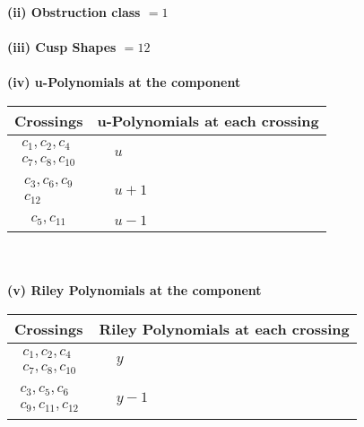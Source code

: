 \documentclass[1p]{elsarticle_modified}
\theoremstyle{definition}
\begin{document}
\flushleft \textbf{(ii) Obstruction class $= 1$}\\~\\
\flushleft \textbf{(iii) Cusp Shapes $= 12$}\\~\\
\newpage\renewcommand{\arraystretch}{1}
\flushleft \textbf{(iv) u-Polynomials at the component}\newline \\
\begin{tabular}{m{50pt}|m{274pt}}
Crossings & \hspace{64pt}u-Polynomials at each crossing \\
\hline $$\begin{aligned}c_{1},c_{2},c_{4}\\c_{7},c_{8},c_{10}\end{aligned}$$&$\begin{aligned}
&u
\end{aligned}$\\
\hline $$\begin{aligned}c_{3},c_{6},c_{9}\\c_{12}\end{aligned}$$&$\begin{aligned}
&u+1
\end{aligned}$\\
\hline $$\begin{aligned}c_{5},c_{11}\end{aligned}$$&$\begin{aligned}
&u-1
\end{aligned}$\\
\hline
\end{tabular}\\~\\
\newpage\renewcommand{\arraystretch}{1}
\flushleft \textbf{(v) Riley Polynomials at the component}\newline \\
\begin{tabular}{m{50pt}|m{274pt}}
Crossings & \hspace{64pt}Riley Polynomials at each crossing \\
\hline $$\begin{aligned}c_{1},c_{2},c_{4}\\c_{7},c_{8},c_{10}\end{aligned}$$&$\begin{aligned}
&y
\end{aligned}$\\
\hline $$\begin{aligned}c_{3},c_{5},c_{6}\\c_{9},c_{11},c_{12}\end{aligned}$$&$\begin{aligned}
&y-1
\end{aligned}$\\
\hline
\end{tabular}\\~\\
\end{document}
